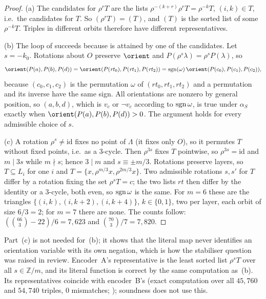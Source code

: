 \begin{proof}
(a) The candidates for $\rho^rT$ are the lists $\rho^{-(k+r)}\rho^rT=\rho^{-k}T$, $(i,k)\in T$, i.e.\ the candidates for
$T$. So $(\rho^rT)=$$(T)$, and $(T)$ is the sorted list of some $\rho^{-k}T$. Triples in
different orbits therefore have different representatives.

(b) The loop of  succeeds because  is attained by one of the candidates. Let $s=-k_0$. Rotations
about $O$ preserve $\orient$ and $P(\rho^s\lambda)=\rho^sP(\lambda)$, so
\[
\orient(P(a),P(b),P(d))=\orient(P(\mathit{rt}_0),P(\mathit{rt}_1),P(\mathit{rt}_2))
=\sgn(\omega)\,\orient(P(c_0),P(c_1),P(c_2)),
\]
because $(c_0,c_1,c_2)$ is the permutation $\omega$ of $(\mathit{rt}_0,\mathit{rt}_1,\mathit{rt}_2)$ and a permutation and
its inverse have the same sign. All orientations are nonzero by general position, so $(a,b,d)$, which is
$v_c$ or $\neg v_c$ according to $\operatorname{sgn}\omega$, is true under $\alpha_S$ exactly when $\orient(P(a),P(b),P(d))>0$. The
argument holds for every admissible choice of $s$.

(c) A rotation $\rho^s\ne\mathrm{id}$ fixes no point of $\Lambda$ (it fixes only $O$), so it permutes $T$ without fixed
points, i.e.\ as a $3$-cycle. Then $\rho^{3s}$ fixes $T$ pointwise, so $\rho^{3s}=\mathrm{id}$ and $m\mid3s$ while $m\nmid s$;
hence $3\mid m$ and $s\equiv\pm m/3$. Rotations preserve layers, so $T\subseteq L_i$ for one $i$ and
$T=\{x,\rho^{m/3}x,\rho^{2m/3}x\}$. Two admissible rotations $s,s'$ for $T$ differ by a rotation fixing the set
$\rho^{s}T=c$; the two lists $\mathit{rt}$ then differ by the identity or a $3$-cycle, both even, so $\operatorname{sgn}\omega$ is the
same. For $m=6$ these are the triangles $\{(i,k),(i,k+2),(i,k+4)\}$, $k\in\{0,1\}$, two per layer, each orbit of size
$6/3=2$; for $m=7$ there are none. The counts follow: $(\binom{66}{3}-22)/6=7{,}623$ and $\binom{70}{3}/7=7{,}820$.
\end{proof}

Part~(c) is not needed for~(b); it shows that the literal map never identifies an orientation variable with its own
negation, which is how the stabiliser question was raised in review. Encoder~A's representative is the least sorted
list $\rho^sT$ over all $s\in\mathbb Z/m$, and its literal function  is correct by the same computation as~(b).
Its representatives coincide with encoder~B's (exact computation over all $45{,}760$ and $54{,}740$ triples, $0$
mismatches; ); soundness does not use this.

